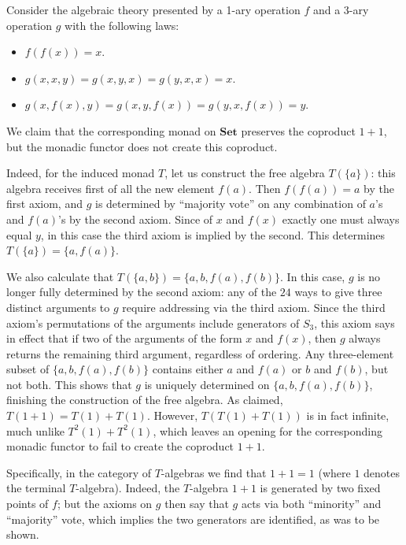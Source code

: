 \documentclass[11pt, oneside, article]{memoir}
\theoremstyle{plain}
\theoremstyle{definition}
\theoremstyle{remark}
\newenvironment{counterexample}
{\renewcommand\qedsymbol{$\lrcorner$}%
  \pushQED{\qed}\mycounterexample}
{\popQED\endmycounterexample}
\newcommand{\namedcat}[1]{\mathbf{#1}}
\newcommand{\Set}{\namedcat{Set}}
\newcommand{\setof}[1]{\{#1\}}
\begin{document}
\begin{counterexample}[Preserved non-created colimit]
  Consider the algebraic theory presented by a 1-ary operation $f$ and
  a 3-ary operation $g$ with the following laws:
  \begin{itemize}
  \item $f(f(x)) = x$.
  \item $g(x,x,y) = g(x,y,x) = g(y,x,x) = x$.
  \item $g(x,f(x),y) = g(x,y,f(x)) = g(y,x,f(x)) = y$.
  \end{itemize}

  We claim that the corresponding monad on $\Set$ preserves the
  coproduct $1 + 1$, but the monadic functor does not create this
  coproduct.
  
  Indeed, for the induced monad $T$, let us construct the free algebra
  $T(\setof{a})$: this algebra receives first of all the new element
  $f(a)$.  Then $f(f(a))=a$ by the first axiom, and $g$ is determined
  by ``majority vote'' on any combination of $a$'s and $f(a)$'s by the
  second axiom.  Since of $x$ and $f(x)$ exactly one must always equal
  $y$, in this case the third axiom is implied by the second. This
  determines $T(\setof{a})=\setof{a,f(a)}$.
  
  We also calculate that $T(\setof{a,b}) = \setof{a,b,f(a),f(b)}$. In
  this case, $g$ is no longer fully determined by the second axiom:
  any of the $24$ ways to give three distinct arguments to $g$ require
  addressing via the third axiom. Since the third axiom's permutations
  of the arguments include generators of $S_3$, this axiom says in
  effect that if two of the arguments of the form $x$ and $f(x)$, then
  $g$ always returns the remaining third argument, regardless of
  ordering. Any three-element subset of $\setof{a,b,f(a),f(b)}$
  contains either $a$ and $f(a)$ or $b$ and $f(b)$, but not both. This
  shows that $g$ is uniquely determined on $\setof{a,b,f(a),f(b)}$,
  finishing the construction of the free algebra. As claimed,
  $T(1+1)=T(1)+T(1)$. However, $T(T(1)+T(1))$ is in fact infinite,
  much unlike $T^2(1)+T^2(1)$, which leaves an opening for the
  corresponding monadic functor to fail to create the coproduct $1+1$.
  
  Specifically, in the category of $T$-algebras we find that
  $1 + 1 = 1$ (where $1$ denotes the terminal $T$-algebra). Indeed,
  the $T$-algebra $1+1$ is generated by two fixed points of $f$; but
  the axioms on $g$ then say that $g$ acts via both ``minority'' and
  ``majority'' vote, which implies the two generators are identified,
  as was to be shown.
\end{counterexample}
\end{document}
